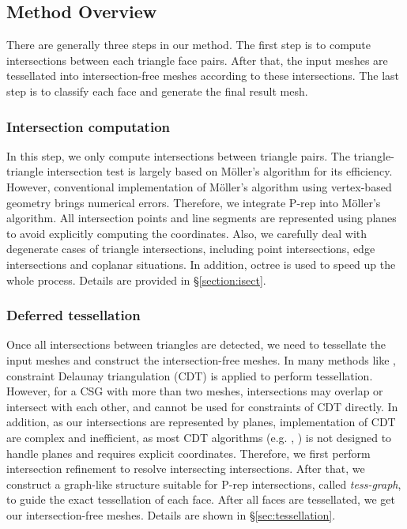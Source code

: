 \documentclass[10pt,journal,compsoc]{IEEEtran}
\begin{document}
\subsection{Method Overview}


There are generally three steps in our method. The first step is to compute intersections between each triangle face pairs. After that, the input meshes are tessellated into intersection-free meshes according to these intersections. The last step is to classify each face and generate the final result mesh.

\subsubsection{Intersection computation}

In this step, we only compute intersections between triangle pairs. The triangle-triangle intersection test is largely based on M\"{o}ller's algorithm \cite{moller1997fast} for its efficiency. However, conventional implementation of M\"{o}ller's algorithm using vertex-based geometry brings numerical errors. Therefore, we integrate P-rep into M\"{o}ller's algorithm. All intersection points and line segments are represented using planes to avoid explicitly computing the coordinates. Also, we carefully deal with degenerate cases of triangle intersections, including point intersections, edge intersections and coplanar situations. In addition, octree is used to speed up the whole process. Details are provided in \S\ref{section:isect}.

\subsubsection{Deferred tessellation}

Once all intersections between triangles are detected, we need to tessellate the input meshes and construct the intersection-free meshes. In many methods like \cite{ogayar2015deferred}, constraint Delaunay triangulation (CDT) is applied to perform tessellation. However, for a CSG with more than two meshes, intersections may overlap or intersect with each other, and cannot be used for constraints of CDT directly. In addition, as our intersections are represented by planes, implementation of CDT are complex and inefficient, as most CDT algorithms (e.g. \cite{chew1989constrained}, \cite{de1992line}) is not designed to handle planes and requires explicit coordinates. Therefore, we first perform intersection refinement to resolve intersecting intersections. After that, we construct a graph-like structure suitable for P-rep intersections, called \emph{tess-graph}, to guide the exact tessellation of each face. After all faces are tessellated, we get our intersection-free meshes. Details are shown in \S\ref{sec:tessellation}.
\end{document}
